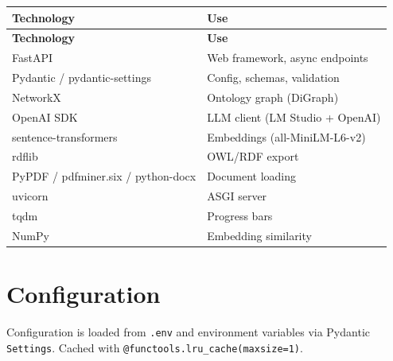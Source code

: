 \documentclass[11pt,a4paper]{article}
\begin{document}
\begin{center}
\begin{longtable}{@{}ll@{}}
\toprule
\textbf{Technology} & \textbf{Use} \\
\midrule
\endfirsthead

\midrule
\textbf{Technology} & \textbf{Use} \\
\midrule
\endhead

FastAPI & Web framework, async endpoints \\
Pydantic / pydantic-settings & Config, schemas, validation \\
NetworkX & Ontology graph (DiGraph) \\
OpenAI SDK & LLM client (LM Studio + OpenAI) \\
sentence-transformers & Embeddings (all-MiniLM-L6-v2) \\
rdflib & OWL/RDF export \\
PyPDF / pdfminer.six / python-docx & Document loading \\
uvicorn & ASGI server \\
tqdm & Progress bars \\
NumPy & Embedding similarity \\
\bottomrule
\end{longtable}
\end{center}

\section{Configuration}

Configuration is loaded from \texttt{.env} and environment variables via Pydantic \texttt{Settings}. Cached with \texttt{@functools.lru\_cache(maxsize=1)}.
\end{document}
